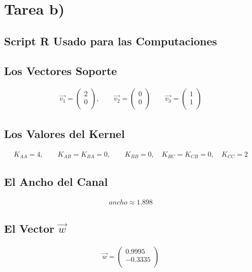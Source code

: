 \documentclass[fleqn]{llncs}
\begin{document}
\newpage


\section{Tarea b)}

\subsection{Script R Usado para las Computaciones}


\newpage

\subsection{Los Vectores Soporte}
\begin{align*}
	\overrightarrow{v_1} =
	\begin{pmatrix}
		2 \\
		0 \\
	\end{pmatrix},
	\qquad
	\overrightarrow{v_2} =
	\begin{pmatrix}
		0 \\
		0 \\
	\end{pmatrix}
	\qquad
	\overrightarrow{v_3} =
	\begin{pmatrix}
		1 \\
		1 \\
	\end{pmatrix}
\end{align*}

\subsection{Los Valores del Kernel}
\begin{align*}
	K_{AA} = 4,
	\qquad
	K_{AB} = K_{BA} = 0,
	\qquad
	K_{BB} = 0,
	\quad
	K_{BC} = K_{CB} = 0,
	\quad
	K_{CC} = 2
\end{align*}

\subsection{El Ancho del Canal}
\begin{align*}
	ancho \approx 1.898
\end{align*}

\subsection{El Vector $\overrightarrow{w}$}
\begin{align*}
	\overrightarrow{w} =
	\begin{pmatrix}
		0.9995 \\
		-0.3335 \\
	\end{pmatrix}
\end{align*}
\end{document}
